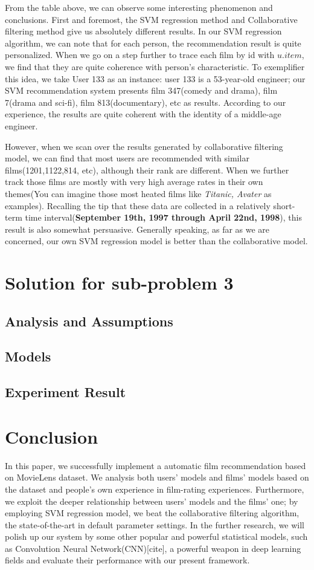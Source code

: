 From the table above, we can observe some interesting phenomenon and conclusions. First and foremost, the SVM regression method and Collaborative filtering method give us absolutely different results. In our SVM regression algorithm, we can note that for each person, the recommendation result is quite personalized. When we go on a step further to trace each film by id with $u.item$, we find that they are quite coherence with person's characteristic. To exemplifier this idea, we take User 133 as an instance: user 133 is a 53-year-old engineer; our SVM recommendation system presents film 347(comedy and drama), film 7(drama and sci-fi), film 813(documentary), etc as results. According to our experience, the results are quite coherent with the identity of a middle-age engineer. 

However, when we scan over the results generated by collaborative filtering model, we can find that most users are recommended with similar films(1201,1122,814, etc), although their rank are different. When we further track those films are mostly with very high average rates in their own themes(You can imagine those most heated films like \textit{Titanic, Avater} as examples). Recalling the tip that these data are collected in a relatively short-term time interval(\textbf{September 19th, 1997 through April 22nd, 1998}), this result is also somewhat persuasive. Generally speaking, as far as we are concerned, our own SVM regression model is better than the collaborative model. 

\section{Solution for sub-problem 3}
\subsection{Analysis and Assumptions}
\subsection{Models}
\subsection{Experiment Result}


\section{Conclusion}
In this paper, we successfully implement a automatic film recommendation based on MovieLens dataset. We analysis both users' models and films' models based on the dataset and people's own experience in film-rating experiences. Furthermore, we exploit the deeper relationship between users' models and the films' one; by employing SVM regression model, we beat the collaborative filtering algorithm, the state-of-the-art in default parameter settings. In the further research, we will polish up our system by some other popular and powerful statistical models, such as Convolution Neural Network(CNN)[cite], a powerful weapon in deep learning fields and evaluate their performance with our present framework.

